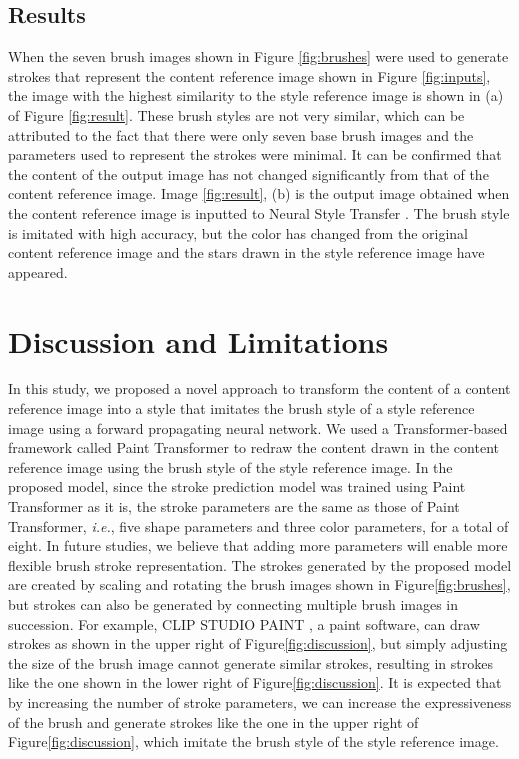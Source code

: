 \documentclass{mva_style}
\begin{document}
\subsection{Results}
When the seven brush images shown in Figure \ref{fig:brushes} were used to 
generate strokes that represent the content reference image shown in Figure 
\ref{fig:inputs}, the image with the highest similarity to the style reference 
image is shown in (a) of Figure \ref{fig:result}. 
These brush styles are not very similar, which can be attributed to the fact 
that there were only seven base brush images and the parameters used to represent 
the strokes were minimal. It can be confirmed that the content of the output 
image has not changed significantly from that of the content reference image.
Image \ref{fig:result}, (b) is the output image obtained when the content 
reference image is inputted to Neural Style Transfer \cite{ImageStyleTransfer}.
The brush style is imitated 
with high accuracy, but the color has changed from the original content 
reference image and the stars drawn in the style reference image have appeared.

\section{Discussion and Limitations}
In this study, we proposed a novel approach to transform the content of a 
content reference image into a style that imitates the brush style of a style 
reference image using a forward propagating neural network. 
We used a Transformer-based framework called Paint Transformer to redraw the 
content drawn in the content reference image using the brush style of the 
style reference image. In the proposed model, since the stroke 
prediction model was trained using Paint Transformer as it is, the stroke 
parameters are the same as those of Paint Transformer, \textit{i.e.}, five shape 
parameters and three color parameters, for a total of eight. In future studies, 
we believe that adding more parameters will enable more flexible brush stroke 
representation. The strokes generated by the proposed model are created by 
scaling and rotating the brush images shown in Figure\ref{fig:brushes}, but 
strokes can also be generated by connecting multiple brush images in 
succession. For example, CLIP STUDIO PAINT \cite{ClipStudio}, a paint software, 
can draw strokes as shown in the upper right of Figure\ref{fig:discussion}, but simply 
adjusting the size of the brush image cannot generate similar strokes, 
resulting in strokes like the one shown in the lower right of Figure\ref{fig:discussion}.
It is expected that by increasing the number of stroke parameters, we can 
increase the expressiveness of the brush and generate strokes like the one 
in the upper right of Figure\ref{fig:discussion}, which imitate the brush style of the 
style reference image. 
\end{document}
